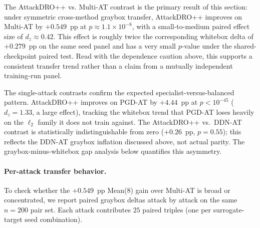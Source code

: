 The AttackDRO++ vs. Multi-AT contrast is the primary result of
this section: under symmetric cross-method graybox transfer,
AttackDRO++ improves on Multi-AT by $+0.549$~pp at
$p \approx 1.1 \times 10^{-8}$, with a small-to-medium paired effect size
of $d_z \approx 0.42$. This effect is roughly twice the corresponding
whitebox delta of $+0.279$~pp on the same seed panel and has a very small
\(p\)-value under the shared-checkpoint paired test. Read with the dependence
caution above, this supports a consistent transfer trend rather than a claim
from a mutually independent training-run panel.

The single-attack contrasts confirm the expected specialist-versus-balanced
pattern. AttackDRO++ improves on PGD-AT by $+4.44$~pp at
$p < 10^{-45}$ ($d_z = 1.33$, a large effect), tracking the whitebox
trend that PGD-AT loses heavily on the $\ell_2$ family it does not train
against. The AttackDRO++ vs.\ DDN-AT contrast is statistically
indistinguishable from zero ($+0.26$~pp, $p = 0.55$); this reflects the
DDN-AT graybox inflation discussed above, not actual parity.  The
graybox-minus-whitebox gap analysis below quantifies this asymmetry.

\paragraph{Per-attack transfer behavior.}

To check whether the $+0.549$~pp Mean(8) gain over Multi-AT is
broad or concentrated, we report paired graybox deltas attack by attack
on the same $n=200$ pair set. Each attack contributes $25$ paired
triples (one per surrogate-target seed combination).

